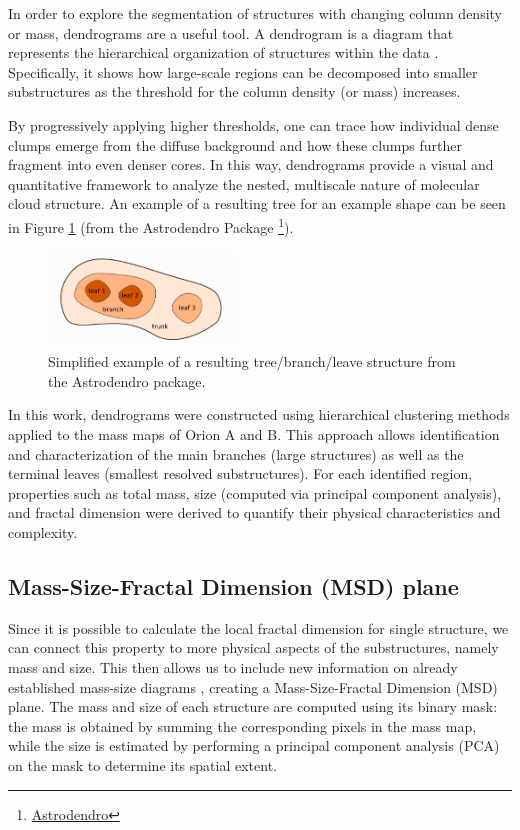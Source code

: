 In order to explore the segmentation of structures with changing column density or mass, dendrograms are a useful tool. A dendrogram is a diagram that represents the hierarchical organization of structures within the data \cite{everitt2010cambridge}. Specifically, it shows how large-scale regions can be decomposed into smaller substructures as the threshold for the column density (or mass) increases.

By progressively applying higher thresholds, one can trace how individual dense clumps emerge from the diffuse background and how these clumps further fragment into even denser cores. In this way, dendrograms provide a visual and quantitative framework to analyze the nested, multiscale nature of molecular cloud structure. An example of a resulting tree for an example shape can be seen in Figure \ref{fig:dendro} (from the Astrodendro Package \footnote{\href{https://dendrograms.readthedocs.io/en/stable/}{Astrodendro}}).

\begin{figure}[t]
    \centering
    \includegraphics[width=0.45\textwidth]{figures/dendrogram.png}
    \caption{Simplified example of a resulting tree/branch/leave structure from the Astrodendro package.}
    \label{fig:dendro}
\end{figure}

In this work, dendrograms were constructed using hierarchical clustering methods applied to the mass maps of Orion A and B. This approach allows identification and characterization of the main branches (large structures) as well as the terminal leaves (smallest resolved substructures). For each identified region, properties such as total mass, size (computed via principal component analysis), and fractal dimension were derived to quantify their physical characteristics and complexity.

\subsection{Mass-Size-Fractal Dimension (MSD) plane}

Since it is possible to calculate the local fractal dimension for single structure, we can connect this property to more physical aspects of the substructures, namely mass and size. This then allows us to include new information on already established mass-size diagrams \cite{Hacar_2025}, creating a Mass-Size-Fractal Dimension (MSD) plane. The mass and size of each structure are computed using its binary mask: the mass is obtained by summing the corresponding pixels in the mass map, while the size is estimated by performing a principal component analysis (PCA) on the mask to determine its spatial extent.

